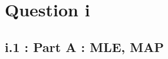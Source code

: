 \documentclass[12pt, a4paper]{article}
\begin{document}
\vspace*{-22pt}
\section*{Question i}
\subsection*{i.1 : Part A : MLE, MAP}
\end{document}
